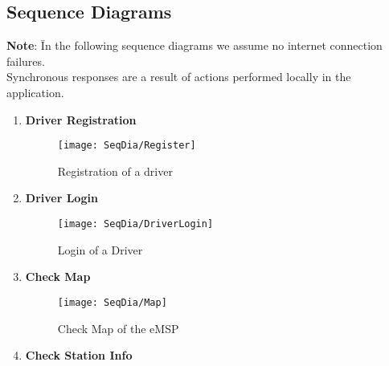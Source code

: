 \subsection{Sequence Diagrams}
\begin{tabbing}
    \textbf{Note}: \= In the following sequence diagrams we assume no internet connection failures. \\
    \> Synchronous responses are a result of actions performed locally in the application.
\end{tabbing}
\begin{enumerate}
        \item \textbf{Driver Registration}
        \begin{figure}[H]
            \begin{center}
            \texttt{[image: SeqDia/Register]}
            \caption{Registration of a driver}
            \label{fig:Register}
            \end{center}
        \end{figure}
        \item \textbf{Driver Login}
        \begin{figure}[H]
            \begin{center}
            \texttt{[image: SeqDia/DriverLogin]}
            \caption{Login of a Driver}
            \label{fig:DriverLogin}
            \end{center}
        \end{figure}
        \newpage
        \item \textbf{Check Map}
        \begin{figure}[H]
            \begin{center}
            \texttt{[image: SeqDia/Map]}
            \caption{Check Map of the eMSP}
            \label{fig:Map}
            \end{center}
        \end{figure}
        \item \textbf{Check Station Info}
        \begin{figure}[H]

\end{figure}
\end{enumerate}
